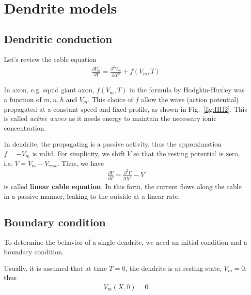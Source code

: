 
\chapter{Dendrite models}
\label{chap:dendrite-models}

\section{Dendritic conduction}
\label{sec:dendritic-conduction}



Let's review the cable equation
\begin{eqnarray}
  \label{eq:439}
    \frac{\partial V_m}{\partial T}  =
   \frac{\partial^2V_m}{\partial X^2} + f(V_m,T)
\end{eqnarray}

In axon, e.g.  squid giant axon, $f(V_m,T)$ in the formula by
Hodgkin-Huxley was a function of $m,n,h$ and $V_m$. This choice of $f$
allow the wave (action potential) propagated at a constant speed and
fixed profile, as shown in Fig.~\ref{fig:HH2}. This is called
{\it active waves} as it needs energy to maintain the necessary ionic
concentration.

In dendrite, the propagating is a passive activity, thus the
approximation $f=-V_m$ is valid. For simplicity, we shift $V$ so that
the resting potential is zero, i.e. $V=V_m-V_{rest}$. Thus, we have
\begin{eqnarray}
  \label{eq:438}
    \frac{\partial V}{\partial T}  =
   \frac{\partial^2V}{\partial X^2} - V
\end{eqnarray}
is called {\bf linear cable equation}.  In this form, the current
flows along the cable in a passive manner, leaking to the outside at a
linear rate. 

\section{Boundary condition}
\label{sec:boundary-condition}

To determine the behavior of a single dendrite, we need an initial
condition and a boundary condition.

Usually, it is assumed that at time $T=0$, the dendrite is at resting
state, $V_m=0$, thus
\begin{eqnarray}
  \label{eq:440}
  V_m(X,0) = 0
\end{eqnarray}

